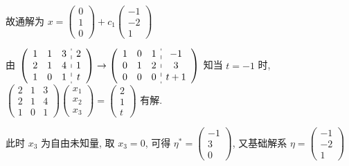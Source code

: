 \begin{enumerate}
                   故通解为 \( x = \begin{pmatrix}
                       0 \\
                       1 \\
                       0
                   \end{pmatrix} + c_{1}\begin{pmatrix}
                       -1 \\
                       -2 \\
                       1
                   \end{pmatrix} \)

                   由 \( \left(\begin{array}{ccc:c}
                           1 & 1 & 3 & 2 \\
                           2 & 1 & 4 & 1 \\
                           1 & 0 & 1 & t
                       \end{array}\right)
                   \to
                   \left(\begin{array}{ccc:c}
                           1 & 0 & 1 & -1  \\
                           0 & 1 & 2 & 3   \\
                           0 & 0 & 0 & t+1
                       \end{array}\right) \) 知当 \( t = -1 \) 时, \( \begin{pmatrix}
                       2 & 1 & 3 \\
                       2 & 1 & 4 \\
                       1 & 0 & 1
                   \end{pmatrix}\begin{pmatrix}
                       x_{1} \\
                       x_{2} \\
                       x_{3}
                   \end{pmatrix} = \begin{pmatrix}
                       2 \\
                       1 \\
                       t
                   \end{pmatrix} \) 有解.

                   此时 \( x_{3} \) 为自由未知量, 取 \( x_{3} = 0 \), 可得 \( \eta^{*} = \begin{pmatrix}
                       -1 \\
                       3  \\
                       0
                   \end{pmatrix} \), 又基础解系 \( \eta = \begin{pmatrix}
                       -1 \\
                       -2 \\
                       1
                   \end{pmatrix} \)


\end{enumerate}

